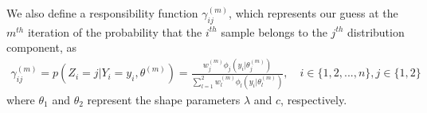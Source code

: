 \documentclass[12pt, draftclsnofoot, onecolumn]{IEEEtran}
\theoremstyle{plain}
\begin{document}
 We also define a responsibility function $\gamma_{ij}^{(m)}$, which represents our guess at the $m^{th}$ iteration of the probability that the $i^{th}$ sample belongs to the $j^{th}$ distribution component, as
 \begin{eqnarray}\label{ResponsibilityF}
 \gamma_{ij}^{(m)}=p(Z_i=j|Y_i=y_i,\theta^{(m)})=\frac{w_j^{(m)} \phi_j(y_i|\theta_j^{(m)})}{\sum_{l=1}^2 w_l^{(m)} \phi_l(y_i|\theta_l^{(m)})}, \quad i\in\{1,2,...,n\}, j \in \{1,2\}
 \end{eqnarray}
 where $\theta_1$ and $\theta_2$ represent the shape parameters $\lambda$ and $c$, respectively.
\end{document}
